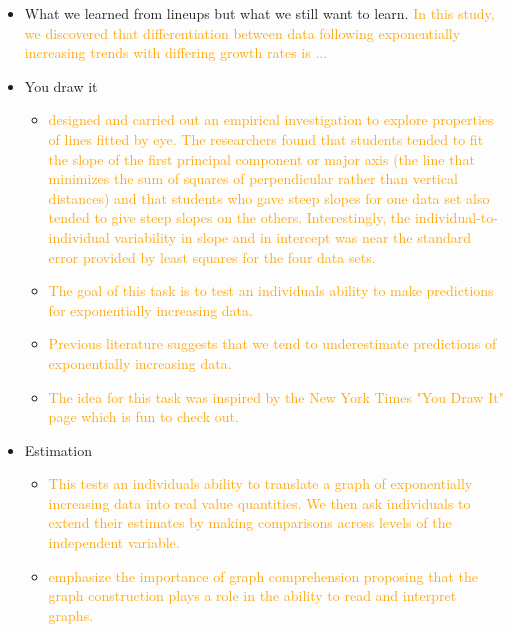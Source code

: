 \documentclass[]{interact}
\theoremstyle{plain}%
\theoremstyle{definition}
\theoremstyle{remark}
\begin{document}
\begin{itemize}
\item
  What we learned from lineups but what we still want to learn.
  \textcolor{Orange}{
  In this study, we discovered that differentiation between data following exponentially increasing trends with differing growth rates is ...
  }
\item
  You draw it

  \begin{itemize}
  \item
    \textcolor{Orange}{\citep{mosteller_eye_1981} designed and carried out an empirical investigation to explore properties of lines fitted by eye. The researchers found that students tended to fit the slope of the first principal component or major axis (the line that minimizes the sum of squares of perpendicular rather than vertical distances) and that students who gave steep slopes for one data set also tended to give steep slopes on the others. Interestingly, the individual-to-individual variability in slope and in intercept was near the standard error provided by least squares for the four data sets.}
  \item
    \textcolor{Orange}{The goal of this task is to test an individuals ability to make predictions for exponentially increasing data.}
  \item
    \textcolor{Orange}{Previous literature suggests that we tend to underestimate predictions of exponentially increasing data.\citep{jones_generalized_1979, jones_polynomial_1977, wagenaar_extrapolation_1978}}
  \item
    \textcolor{Orange}{The idea for this task was inspired by the New York Times "You Draw It" page which is fun to check out.}
  \end{itemize}
\item
  Estimation

  \begin{itemize}
  \item
    \textcolor{Orange}{This tests an individuals ability to translate a graph of exponentially increasing data into real value quantities. We then ask individuals to extend their estimates by making comparisons across levels of the independent variable.}
  \item
    \textcolor{Orange}{\citep{friel_making_2001} emphasize the importance of graph comprehension proposing that the graph construction plays a role in the ability to read and interpret graphs.}
  \end{itemize}
\end{itemize}
\end{document}
